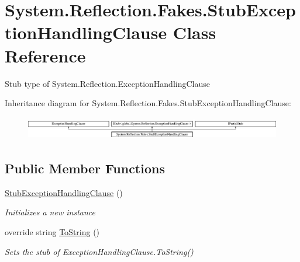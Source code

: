 \hypertarget{class_system_1_1_reflection_1_1_fakes_1_1_stub_exception_handling_clause}{\section{System.\-Reflection.\-Fakes.\-Stub\-Exception\-Handling\-Clause Class Reference}
\label{class_system_1_1_reflection_1_1_fakes_1_1_stub_exception_handling_clause}
}


Stub type of System.\-Reflection.\-Exception\-Handling\-Clause 


Inheritance diagram for System.\-Reflection.\-Fakes.\-Stub\-Exception\-Handling\-Clause\-:\begin{figure}[H]
\begin{center}
\leavevmode
\includegraphics[height=1.042830cm]{class_system_1_1_reflection_1_1_fakes_1_1_stub_exception_handling_clause}
\end{center}
\end{figure}
\subsection*{Public Member Functions}
\begin{DoxyCompactItemize}
\item 
\hyperlink{class_system_1_1_reflection_1_1_fakes_1_1_stub_exception_handling_clause_ada8ce85d1c7f1244f8800cd840655575}{Stub\-Exception\-Handling\-Clause} ()
\begin{DoxyCompactList}\small\item\em Initializes a new instance\end{DoxyCompactList}\item 
override string \hyperlink{class_system_1_1_reflection_1_1_fakes_1_1_stub_exception_handling_clause_aa2bd297017f939b206dbbbb3826a4e91}{To\-String} ()
\begin{DoxyCompactList}\small\item\em Sets the stub of Exception\-Handling\-Clause.\-To\-String()\end{DoxyCompactList}\end{DoxyCompactItemize}
